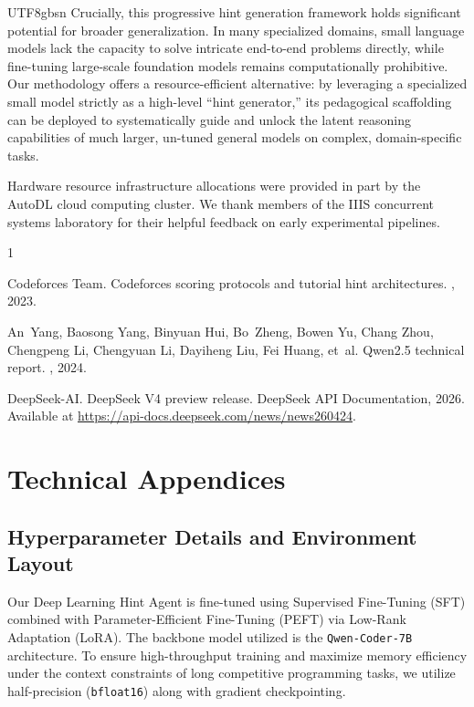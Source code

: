 \documentclass{article}
\begin{document}
\begin{CJK*}{UTF8}{gbsn}
Crucially, this progressive hint generation framework holds significant potential for broader generalization. In many specialized domains, small language models lack the capacity to solve intricate end-to-end problems directly, while fine-tuning large-scale foundation models remains computationally prohibitive. Our methodology offers a resource-efficient alternative: by leveraging a specialized small model strictly as a high-level ``hint generator,'' its pedagogical scaffolding can be deployed to systematically guide and unlock the latent reasoning capabilities of much larger, un-tuned general models on complex, domain-specific tasks.

\begin{ack}
Hardware resource infrastructure allocations were provided in part by the AutoDL cloud computing cluster. We thank members of the IIIS concurrent systems laboratory for their helpful feedback on early experimental pipelines.
\end{ack}

\begin{thebibliography}{1}

Codeforces Team.
\newblock Codeforces scoring protocols and tutorial hint architectures.
, 2023.

An~Yang, Baosong Yang, Binyuan Hui, Bo~Zheng, Bowen Yu, Chang Zhou, Chengpeng Li, Chengyuan Li, Dayiheng Liu, Fei Huang, et~al.
\newblock Qwen2.5 technical report.
, 2024.

DeepSeek-AI.
\newblock DeepSeek V4 preview release.
\newblock DeepSeek API Documentation, 2026.
\newblock Available at \url{https://api-docs.deepseek.com/news/news260424}.

\end{thebibliography}

\newpage
\appendix
\section{Technical Appendices}
\subsection{Hyperparameter Details and Environment Layout}
Our Deep Learning Hint Agent is fine-tuned using Supervised Fine-Tuning (SFT) combined with Parameter-Efficient Fine-Tuning (PEFT) via Low-Rank Adaptation (LoRA). The backbone model utilized is the \texttt{Qwen-Coder-7B} architecture. To ensure high-throughput training and maximize memory efficiency under the context constraints of long competitive programming tasks, we utilize half-precision (\texttt{bfloat16}) along with gradient checkpointing.


\end{CJK*}
\end{document}
